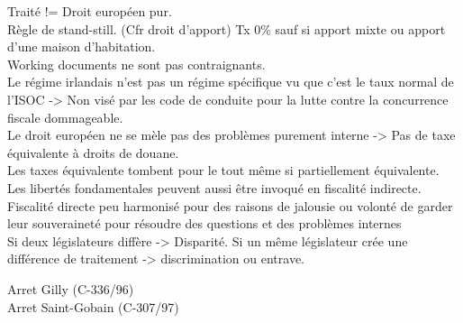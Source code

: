 \documentclass{book}
\begin{document}
Traité != Droit européen pur.\\

Règle de stand-still. (Cfr droit d'apport) Tx 0\% sauf si apport mixte ou apport d'une maison d'habitation.\\

Working documents ne sont pas contraignants.\\

Le régime irlandais n'est pas un régime spécifique vu que c'est le taux normal de l'ISOC -> Non visé par les code de conduite pour la lutte contre la concurrence fiscale dommageable.\\


Le droit européen ne se mèle pas des problèmes purement interne -> Pas de taxe équivalente à droits de douane.\\

Les taxes équivalente tombent pour le tout même si partiellement équivalente.\\

Les libertés fondamentales peuvent aussi être invoqué en fiscalité indirecte.\\

Fiscalité directe peu harmonisé pour des raisons de jalousie ou volonté de garder leur souveraineté pour résoudre des questions et des problèmes internes\\

Si deux législateurs diffère -> Disparité.
Si un même législateur crée une différence de traitement -> discrimination ou entrave. 

Arret Gilly (C-336/96)\\ 

Arret Saint-Gobain (C-307/97)\\
\nocite{*}

\end{document}

